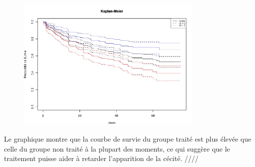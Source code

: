\documentclass[../main.tex]{subfiles}
\begin{document}
\begin{CJK*}{UTF8}{gbsn}
\begin{figure}[H]
  \centering
  \includegraphics[width=0.8\textwidth]{1BC.JPG}
  \label{fig:mesh1}
\end{figure}

Le graphique montre que la courbe de survie du groupe traité est 
plus élevée que celle du groupe non traité à la plupart des moments, 
ce qui suggère que le traitement puisse aider à retarder l'apparition de la cécité. ////

\end{CJK*}
\end{document}
